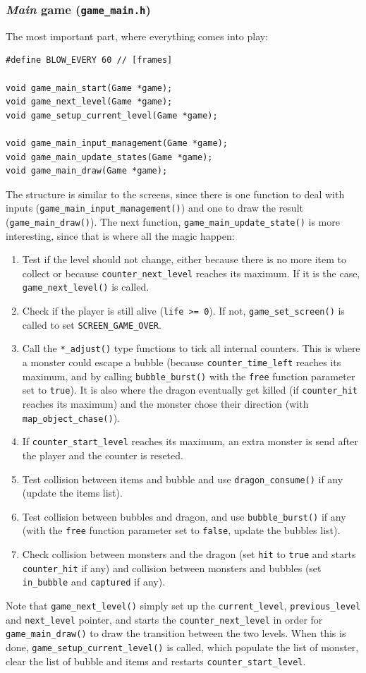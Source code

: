 \documentclass[12pt,a4paper]{article}
\newcommand{\cc}[1]{\texttt{#1}}
\begin{document}
\subsubsection{\textit{Main} game (\texttt{game\_main.h})}

The most important part, where everything comes into play:\begin{verbatim}
#define BLOW_EVERY 60 // [frames]

void game_main_start(Game *game);
void game_next_level(Game *game);
void game_setup_current_level(Game *game);

void game_main_input_management(Game *game);
void game_main_update_states(Game *game);
void game_main_draw(Game *game);
\end{verbatim}

The structure is similar to the screens, since there is one function to deal with inputs (\cc{game_main_input_management()}) and one to draw the result (\cc{game_main_draw()}). The next function, \cc{game_main_update_state()} is more interesting, since that is where all the magic happen:\begin{enumerate}
\item Test if the level should not change, either because there is no more item to collect or because \cc{counter_next_level} reaches its maximum. If it is the case, \cc{game_next_level()} is called.
\item Check if the player is still alive (\cc{life >= 0}). If not, \cc{game_set_screen()} is called to set \cc{SCREEN_GAME_OVER}.
\item Call the \cc{*_adjust()} type functions to tick all internal counters. This is where a monster could escape a bubble (because \cc{counter_time_left} reaches its maximum, and by calling \cc{bubble_burst()} with the \cc{free} function parameter set to \cc{true}). It is also where the dragon eventually get killed (if \cc{counter_hit} reaches its maximum) and the monster chose their direction (with \cc{map_object_chase()}).
\item If \cc{counter_start_level} reaches its maximum, an extra monster is send after the player and the counter is reseted.
\item Test collision between items and bubble and use \cc{dragon_consume()} if any (update the items list).
\item Test collision between bubbles and dragon, and use \cc{bubble_burst()} if any (with the \cc{free} function parameter set to \cc{false}, update the bubbles list).
\item Check collision between monsters and the dragon (set \cc{hit} to \cc{true} and starts \cc{counter_hit} if any) and collision between monsters and bubbles (set \cc{in_bubble} and \cc{captured} if any).
\end{enumerate}
Note that \cc{game_next_level()} simply set up the \cc{current_level}, \cc{previous_level} and \cc{next_level} pointer, and starts the \cc{counter_next_level} in order for \cc{game_main_draw()} to draw the transition between the two levels. When this is done, \cc{game_setup_current_level()} is called, which populate the list of monster, clear the list of bubble and items and restarts \cc{counter_start_level}.
\end{document}
